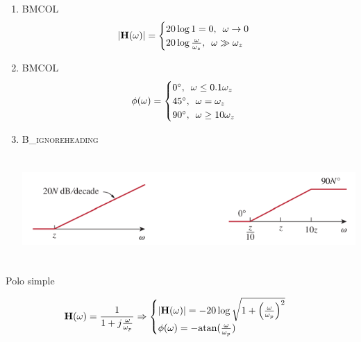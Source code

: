 \begin{enumerate}
\item \hfill{}\textsc{BMCOL}
\label{sec:org18a1aae}
\[
  |\mathbf{H}(\omega)| = 
  \begin{cases}
  20 \log 1 = 0, \enskip \omega \to 0\\
  20 \log \frac{\omega}{\omega_z}, \enskip \omega \gg \omega_z\\
  \end{cases}
\]

\item \hfill{}\textsc{BMCOL}
\label{sec:orgff9fa7c}
\[
  \phi(\omega) = 
  \begin{cases}
    \ang{0},\enskip \omega \leq 0.1\omega_z\\
    \ang{45}, \enskip \omega = \omega_z\\
    \ang{90}, \enskip \omega \geq 10\omega_z\\
  \end{cases}
\]

\item \hfill{}\textsc{B\_ignoreheading}
\label{sec:org66bf0da}
\begin{center}
\includegraphics[height=4cm]{../figs/BodeCeroSimple.pdf}
\end{center}
\end{enumerate}

{Polo simple}

\[
  \mathbf{H}(\omega) = \frac{1}{1 + j\frac{\omega}{\omega_p}} \Rightarrow
  \begin{cases}
    |\mathbf{H}(\omega)| =  - 20 \log \sqrt{1 + \left(\frac{\omega}{\omega_p}\right)^2}\\
    \phi(\omega) = - \mathrm{atan}(\frac{\omega}{\omega_p}) 
  \end{cases}
\]

